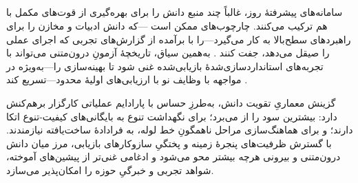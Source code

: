 \subsection[راهبردهای تقویتِ آمیخته]{}

سامانه‌های پیشرفتهٔ روز، غالباً چند منبع دانش را برای بهره‌گیری از قوت‌های مکمل با هم ترکیب می‌کنند. چارچوب‌های  ممکن است —که دانش ادبیات و مخازن را برای راهبردهای سطح‌بالا به کار می‌گیرد—را با  برآمده از گزارش‌های تجربی که اجرای عملی را صیقل می‌دهد، جفت کنند \cite{trirat2025automlagent, Yang2025NADER}. به‌همین سیاق، تاریخچهٔ آزمونِ درون‌متنی می‌تواند با تجربه‌های استانداردسازی‌شدهٔ بازیابی‌شده غنی شود تا  بهینه‌سازی را—به‌ویژه در مواجهه با وظایف نو با ارزیابی‌های اولیهٔ محدود—تسریع کند \cite{zhang-etal-2024-MLCopilot}.

گزینش معماریِ تقویت دانش، به‌طرزِ حساس با پارادایم عملیاتی کارگزار برهم‌کنش دارد:  بیشترین سود را از  می‌برد؛  برای نگهداشت تنوع به بایگانی‌های کیفیت-تنوع اتکا دارند؛ و  برای هماهنگ‌سازی مراحل ناهمگونِ خط لوله، به فرادادهٔ ساخت‌یافته نیازمندند. با گسترش ظرفیت‌های پنجرهٔ زمینه و پختگیِ سازوکارهای بازیابی، مرز میان دانش درون‌متنی و بیرونی هرچه بیشتر محو می‌شود و ادغامی غنی‌تر از پیشین‌های آموخته، شواهد تجربی و خبرگیِ حوزه را امکان‌پذیر می‌سازد.